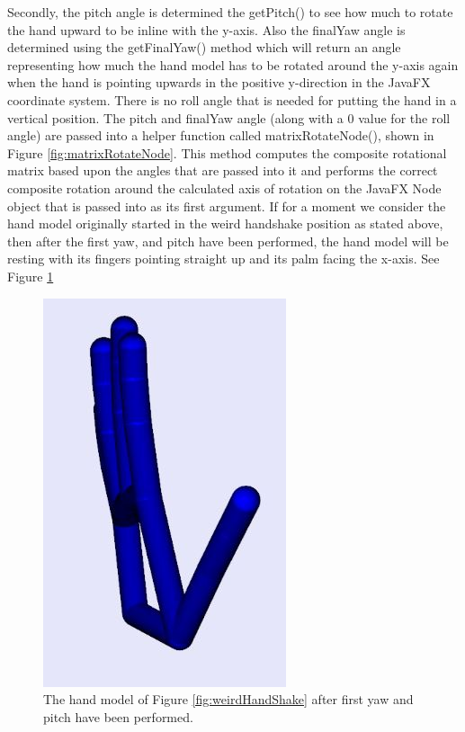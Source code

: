Secondly, the pitch angle is determined the getPitch() to see how much to rotate the hand upward to be inline with the y-axis. Also the finalYaw angle is determined using the getFinalYaw() method which will return an angle representing how much the hand model has to be rotated around the y-axis again when the hand is pointing upwards in the positive y-direction in the JavaFX coordinate system. There is no roll angle that is needed for putting the hand in a vertical position. The pitch and finalYaw angle (along with a 0 value for the roll angle) are passed into a helper function called matrixRotateNode(), shown in Figure \ref{fig:matrixRotateNode}. This method computes the composite rotational matrix based upon the angles that are passed into it and performs the correct composite rotation around the calculated axis of rotation on the JavaFX Node object that is passed into as its first argument. If for a moment we consider the hand model originally started in the weird handshake position as stated above, then after the first yaw, and pitch have been performed, the hand model will be resting with its fingers pointing straight up and its palm facing the x-axis. See Figure \ref{fig:afterPitch}
\begin{figure}[H]
\centering
\includegraphics[scale=0.65]{Figures/4_afterPitch.JPG}
\caption[After Pitch]{The hand model of Figure \ref{fig:weirdHandShake} after first yaw and pitch have been performed.}
\label{fig:afterPitch}
\end{figure}

